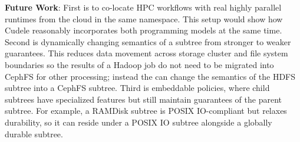 \textbf{Future Work}: First is to co-locate HPC workflows with real highly
parallel runtimes from the cloud in the same namespace. This setup would show
how Cudele reasonably incorporates both programming models at the same time.
Second is dynamically changing semantics of a subtree from stronger to weaker
guarantees. This reduces data movement across storage cluster and file system
boundaries so the results of a Hadoop job do not need to be migrated into
CephFS for other processing; instead the
 can change the semantics of the
HDFS subtree into a CephFS subtree. Third is embeddable policies, where child
subtrees have specialized features but still maintain guarantees of the
parent subtree.  For example, a RAMDisk subtree is POSIX IO-compliant but
relaxes durability, so it can reside under a POSIX IO subtree
alongside a globally durable subtree.\vspace{-1ex}









